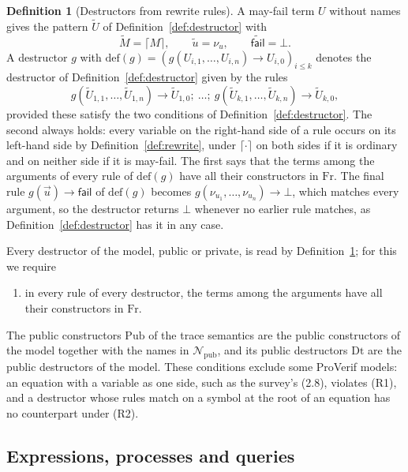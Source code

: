 \documentclass[11pt]{article}
\theoremstyle{definition}
\newtheorem{definition}{Definition}[section]
\theoremstyle{plain}
\theoremstyle{remark}
\newcommand{\Fr}{\mathrm{Fr}}
\newcommand{\Pub}{\mathrm{Pub}}
\newcommand{\Dt}{\mathrm{Dt}}
\begin{document}
\begin{definition}[Destructors from rewrite rules]\label{def:rules}
A may-fail term $U$ without names gives the pattern $\widetilde{U}$ of Definition~\ref{def:destructor} with
\[
\widetilde{M}=\lceil M\rceil,\qquad\widetilde{u}=\nu_u,\qquad\widetilde{\mathsf{fail}}=\bot.
\]
A destructor $g$ with $\mathrm{def}(g)=(g(U_{i,1},\dots,U_{i,n})\to U_{i,0})_{i\le k}$ denotes the destructor of Definition~\ref{def:destructor} given by the rules
\[
g(\widetilde{U}_{1,1},\dots,\widetilde{U}_{1,n})\to\widetilde{U}_{1,0};\ \dots;\ g(\widetilde{U}_{k,1},\dots,\widetilde{U}_{k,n})\to\widetilde{U}_{k,0},
\]
provided these satisfy the two conditions of Definition~\ref{def:destructor}. The second always holds: every variable on the right-hand side of a rule occurs on its left-hand side by Definition~\ref{def:rewrite}, under $\lceil\cdot\rceil$ on both sides if it is ordinary and on neither side if it is may-fail. The first says that the terms among the arguments of every rule of $\mathrm{def}(g)$ have all their constructors in $\Fr$. The final rule $g(\vec u)\to\mathsf{fail}$ of $\mathrm{def}(g)$ becomes $g(\nu_{u_1},\dots,\nu_{u_n})\to\bot$, which matches every argument, so the destructor returns $\bot$ whenever no earlier rule matches, as Definition~\ref{def:destructor} has it in any case.
\end{definition}

Every destructor of the model, public or private, is read by Definition~\ref{def:rules}; for this we require
\begin{enumerate}
\item[(R2)] in every rule of every destructor, the terms among the arguments have all their constructors in $\Fr$.
\end{enumerate}
The public constructors $\Pub$ of the trace semantics are the public constructors of the model together with the names in $\mathcal{N}_{\mathrm{pub}}$, and its public destructors $\Dt$ are the public destructors of the model. These conditions exclude some ProVerif models: an equation with a variable as one side, such as the survey's (2.8), violates (R1), and a destructor whose rules match on a symbol at the root of an equation has no counterpart under (R2).

\subsection{Expressions, processes and queries}
\end{document}
